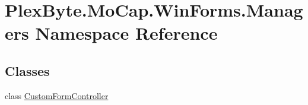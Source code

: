 \hypertarget{namespace_plex_byte_1_1_mo_cap_1_1_win_forms_1_1_managers}{}\section{Plex\+Byte.\+Mo\+Cap.\+Win\+Forms.\+Managers Namespace Reference}
\label{namespace_plex_byte_1_1_mo_cap_1_1_win_forms_1_1_managers}
\subsection*{Classes}
\begin{DoxyCompactItemize}
\item 
class \hyperlink{class_plex_byte_1_1_mo_cap_1_1_win_forms_1_1_managers_1_1_custom_form_controller}{Custom\+Form\+Controller}
\end{DoxyCompactItemize}
